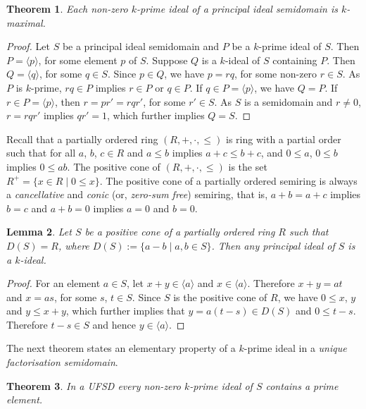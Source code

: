 \documentclass[11pt,english]{amsart}
\newtheorem{theorem}{Theorem}[section]
\newtheorem{lemma}[theorem]{Lemma}
\theoremstyle{definition}
\numberwithin{equation}{section}
\begin{document}
\begin{theorem}
Each non-zero $k$-prime ideal of a principal ideal semidomain is $k$-maximal.
\end{theorem}

\begin{proof}
Let $S$ be a principal ideal semidomain and $P$ be a $k$-prime ideal of $S$. Then $P=\langle p \rangle$, for some element $p$ of $S$. Suppose $Q$ is a $k$-ideal of $S$ containing $P$. Then $Q=\langle q \rangle$, for some $q\in S$. Since $p\in Q$, we have $p=rq$, for some non-zero $r\in S$. As $P$ is $k$-prime, $rq\in P$ implies $r\in P$ or $q\in P$. If $q\in P=\langle p \rangle$, we have $Q=P$. If $r\in P=\langle p \rangle$, then $r=pr'=rqr'$, for some $r'\in S$. As $S$ is a semidomain and $r\neq 0$, $r=rqr'$ implies $qr'=1$, which further implies $Q=S$.	
\end{proof}

Recall that a partially ordered ring $(R,+,\cdot,\leqslant)$ is ring with a partial order such that for all $a$, $b$, $c\in R$ and $a\leqslant b$ implies $a+c\leqslant b+c$, and $0\leqslant a$, $0\leqslant b$ implies $0\leqslant ab$. The positive cone of $(R,+,\cdot,\leqslant)$ is the set $R^+=\{x\in R\mid 0\leqslant x\}$. The positive cone of a partially ordered semiring is always a \emph{cancellative} and \emph{conic} (or, \emph{zero-sum free}) semiring, that is, $a+b=a+c$ implies $b=c$ and $a+b=0$ implies $a=0$ and $b=0$.

\begin{lemma}\label{loc9}
    Let $S$ be a positive cone of a partially ordered ring $R$ such that $D(S)=R$, where $D(S):=\{a-b \mid a,b\in S\}$. Then any principal ideal of $S$ is a $k$-ideal.
\end{lemma}

\begin{proof}
    For an element $a\in S$, let $x+y\in \langle a\rangle$ and $x\in \langle a\rangle$. Therefore $x+y=at$ and $x=as$, for some $s$, $t\in S$. 
    Since $S$ is the positive cone of $R$, we have $0\leqslant x$, $y$ and $y\leqslant x+y$, which further implies that $y=a(t-s)\in D(S)$ and $0\leqslant t-s$. Therefore $t-s\in S$ and hence $y\in \langle a\rangle$. 
\end{proof}

The next theorem states an elementary property of a $k$-prime ideal in a \emph{unique factorisation semidomain}.

\begin{theorem}
In a \emph{UFSD} every non-zero $k$-prime
ideal of $S$ contains a prime element.
\end{theorem}
\end{document}
